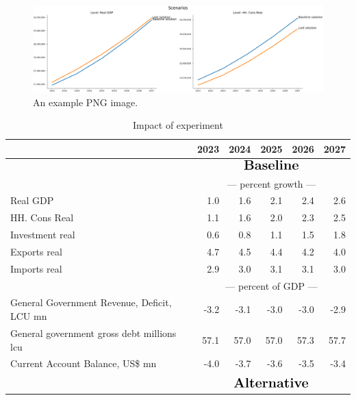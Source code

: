 \documentclass{article}
\begin{document}
\begin{figure}[htbp]
\centering
\includegraphics[width=\textwidth]{onefig.png}
\caption{An example PNG image.}
\label{fig:examplepng}
\end{figure}
\begin{table}[ht]
\caption{Impact of experiment}
\begin{tabular}{lrrrrr}
\toprule
 & 2023 & 2024 & 2025 & 2026 & 2027 \\
\midrule
&\multicolumn{5}{c}{{$\Large \textbf{Baseline}$}}                                                                                                     \\
&\multicolumn{5}{c}{{---  percent growth ---}}                                                                                                     \\
Real GDP & 1.0 & 1.6 & 2.1 & 2.4 & 2.6 \\
HH. Cons Real & 1.1 & 1.6 & 2.0 & 2.3 & 2.5 \\
Investment real & 0.6 & 0.8 & 1.1 & 1.5 & 1.8 \\
Exports real & 4.7 & 4.5 & 4.4 & 4.2 & 4.0 \\
Imports real & 2.9 & 3.0 & 3.1 & 3.1 & 3.0 \\
&\multicolumn{5}{c}{{---  percent of GDP ---}}                                                                                                     \\
General Government Revenue, Deficit, LCU mn & -3.2 & -3.1 & -3.0 & -3.0 & -2.9 \\
General government gross debt millions lcu & 57.1 & 57.0 & 57.0 & 57.3 & 57.7 \\
Current Account Balance, US\$ mn & -4.0 & -3.7 & -3.6 & -3.5 & -3.4 \\
&\multicolumn{5}{c}{{ }}                                                                                                     \\
&\multicolumn{5}{c}{{$\Large \textbf{Alternative}$}}                                                                                                     \\

\end{tabular}
\end{table}
\end{document}
